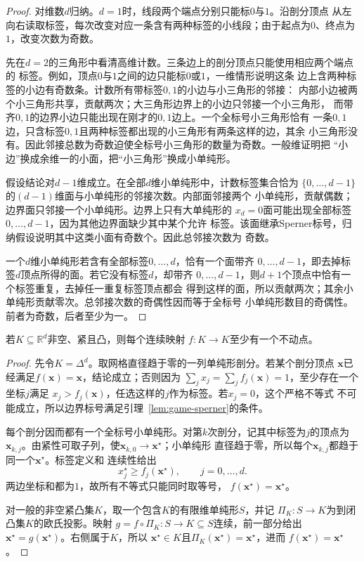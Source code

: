 \begin{proof}
对维数\(d\)归纳。\(d=1\)时，线段两个端点分别只能标\(0\)与\(1\)。沿剖分顶点
从左向右读取标签，每次改变对应一条含有两种标签的小线段；由于起点为\(0\)、终点为
\(1\)，改变次数为奇数。

先在\(d=2\)的三角形中看清高维计数。三条边上的剖分顶点只能使用相应两个端点的
标签。例如，顶点\(0\)与\(1\)之间的边只能标\(0\)或\(1\)，一维情形说明这条
边上含两种标签的小边有奇数条。计数所有带标签\(0,1\)的小边与小三角形的邻接：
内部小边被两个小三角形共享，贡献两次；大三角形边界上的小边只邻接一个小三角形，
而带齐\(0,1\)的边界小边只能出现在刚才的\(0,1\)边上。一个全标号小三角形恰有
一条\(0,1\)边，只含标签\(0,1\)且两种标签都出现的小三角形有两条这样的边，其余
小三角形没有。因此邻接总数为奇数迫使全标号小三角形的数量为奇数。一般维证明把
“小边”换成余维一的小面，把“小三角形”换成小单纯形。

假设结论对\(d-1\)维成立。在全部\(d\)维小单纯形中，计数标签集合恰为
\(\{0,\ldots,d-1\}\)的\((d-1)\)维面与小单纯形的邻接次数。内部面邻接两个
小单纯形，贡献偶数；边界面只邻接一个小单纯形。边界上只有大单纯形的
\(x_d=0\)面可能出现全部标签\(0,\ldots,d-1\)，因为其他边界面缺少其中某个允许
标签。该面继承Sperner标号，归纳假设说明其中这类小面有奇数个。因此总邻接次数为
奇数。

一个\(d\)维小单纯形若含有全部标签\(0,\ldots,d\)，恰有一个面带齐
\(0,\ldots,d-1\)，即去掉标签\(d\)顶点所得的面。若它没有标签\(d\)，却带齐
\(0,\ldots,d-1\)，则\(d+1\)个顶点中恰有一个标签重复，去掉任一重复标签顶点都会
得到这样的面，所以贡献两次；其余小单纯形贡献零次。总邻接次数的奇偶性因而等于全标号
小单纯形数目的奇偶性。前者为奇数，后者至少为一。
\end{proof}

\begin{theorem}[Brouwer不动点定理]
\label{thm:game-brouwer}
若\(K\subseteq\mathbb{R}^d\)非空、紧且凸，则每个连续映射
\(f:K\to K\)至少有一个不动点。
\end{theorem}

\begin{proof}
先令\(K=\Delta^d\)。取网格直径趋于零的一列单纯形剖分。若某个剖分顶点
\(\bm{x}\)已经满足\(f(\bm{x})=\bm{x}\)，结论成立；否则因为
\(\sum_jx_j=\sum_jf_j(\bm{x})=1\)，至少存在一个坐标\(j\)满足
\(x_j>f_j(\bm{x})\)，任选这样的\(j\)作为标签。若\(x_j=0\)，这个严格不等式
不可能成立，所以边界标号满足引理~\ref{lem:game-sperner}的条件。

每个剖分因而都有一个全标号小单纯形。对第\(k\)次剖分，记其中标签为\(j\)的顶点为
\(\bm{x}_{k,j}\)。由紧性可取子列，使\(\bm{x}_{k,0}\to\bm{x}^\star\)；小单纯形
直径趋于零，所以每个\(\bm{x}_{k,j}\)都趋于同一个\(\bm{x}^\star\)。标签定义和
连续性给出
\[
  x_j^\star\geq f_j(\bm{x}^\star),
  \qquad j=0,\ldots,d.
\]
两边坐标和都为\(1\)，故所有不等式只能同时取等号，
\(f(\bm{x}^\star)=\bm{x}^\star\)。

对一般的非空紧凸集\(K\)，取一个包含\(K\)的有限维单纯形\(S\)，并记
\(\Pi_K:S\to K\)为到闭凸集\(K\)的欧氏投影。映射
\(g=f\circ\Pi_K:S\to K\subseteq S\)连续，前一部分给出
\(\bm{x}^\star=g(\bm{x}^\star)\)。右侧属于\(K\)，所以
\(\bm{x}^\star\in K\)且\(\Pi_K(\bm{x}^\star)=\bm{x}^\star\)，进而
\(f(\bm{x}^\star)=\bm{x}^\star\)。
\end{proof}

